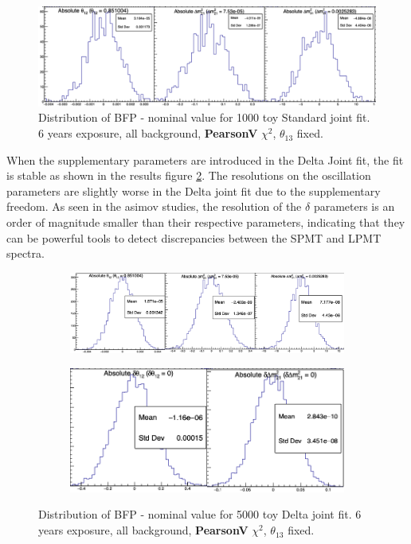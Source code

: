 \documentclass[../main.tex]{subfiles}
\begin{document}
\begin{figure}[ht]
  \centering
  \includegraphics[width=\linewidth]{images/joint_fit/absolute_standard_joint_pearsonV.png}
  \caption{Distribution of BFP - nominal value for 1000 toy Standard joint fit. 6 years exposure, all background, \textbf{PearsonV} $\chi^2$, $\theta_{13}$ fixed.}
  \label{fig:joint_fit:abs_standard_pearsonV}
\end{figure}

When the supplementary parameters are introduced in the Delta Joint fit, the fit is stable as shown in the results figure \ref{fig:joint_fit:delta_fit}. The resolutions on the oscillation parameters are slightly worse in the Delta joint fit due to the supplementary freedom. As seen in the asimov studies, the resolution of the $\delta$ parameters is an order of magnitude smaller than their respective parameters, indicating that they can be powerful tools to detect discrepancies between the SPMT and LPMT spectra.

\begin{figure}[ht]
  \centering
  \begin{subfigure}[t]{0.98\linewidth}
    \centering
    \includegraphics[width=\linewidth]{images/joint_fit/normal_delta_joint.png}
  \end{subfigure}

  \begin{subfigure}[t]{0.66\linewidth}
    \centering
    \includegraphics[width=\linewidth]{images/joint_fit/supp_delta_joint.png}
  \end{subfigure}

  \caption{Distribution of BFP - nominal value for 5000 toy Delta joint fit. 6 years exposure, all background, \textbf{PearsonV} $\chi^2$, $\theta_{13}$ fixed.}
  \label{fig:joint_fit:delta_fit}
\end{figure}
\end{document}
